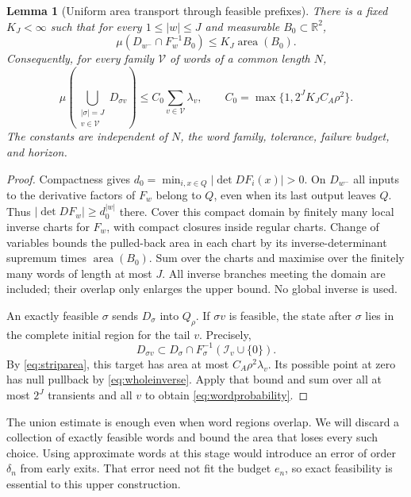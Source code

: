 \documentclass[11pt]{amsart}
\newtheorem{lemma}[theorem]{Lemma}
\theoremstyle{definition}
\theoremstyle{remark}
\newcommand{\R}{\mathbb R}
\newcommand{\area}{\operatorname{area}}
\numberwithin{equation}{section}
\begin{document}
\begin{lemma}[Uniform area transport through feasible prefixes]\label{lem:probtransport}
There is a fixed $K_J<\infty$ such that for every $1\le|w|\le J$
and measurable $B_0\subset\R^2$,
\begin{equation}\label{eq:wholeinverse}
\mu(D_{w^-}\cap F_w^{-1}B_0)\le K_J\area(B_0).
\end{equation}
Consequently, for every family $\mathcal V$ of words of a common
length $N$,
\begin{equation}\label{eq:wordprobability}
\mu\!\left(\bigcup_{\substack{|\sigma|=J\\v\in\mathcal V}}
D_{\sigma v}\right)\le C_0\sum_{v\in\mathcal V}\lambda_v,
\qquad C_0=\max\{1,2^JK_JC_A\rho^2\}.
\end{equation}
The constants are independent of $N$, the word family, tolerance,
failure budget, and horizon.
\end{lemma}
\begin{proof}
Compactness gives $d_0=\min_{i,x\in Q}|\det DF_i(x)|>0$.
On $D_{w^-}$ all inputs to the derivative factors of $F_w$
belong to $Q$, even when its last output leaves $Q$. Thus
$|\det DF_w|\ge d_0^{|w|}$ there. Cover this compact domain by
finitely many local inverse charts for $F_w$, with compact closures
inside regular charts. Change of variables bounds the pulled-back
area in each chart by its inverse-determinant supremum times
$\area(B_0)$. Sum over the charts and maximise over the finitely
many words of length at most $J$. All inverse branches meeting the
domain are included; their overlap only enlarges the upper bound.
No global inverse is used.

An exactly feasible $\sigma$ sends $D_\sigma$ into $Q_\rho$.
If $\sigma v$ is feasible, the state after $\sigma$ lies in the
complete initial region for the tail $v$. Precisely,
\[
D_{\sigma v}\subset
D_\sigma\cap F_\sigma^{-1}(\mathcal I_v\cup\{0\}).
\]
By \eqref{eq:striparea}, this target has area at most
$C_A\rho^2\lambda_v$. Its possible point at zero has null
pullback by \eqref{eq:wholeinverse}. Apply that bound and sum
over all at most $2^J$ transients and all $v$ to obtain
\eqref{eq:wordprobability}.
\end{proof}

The union estimate is enough even when word regions overlap.
We will discard a collection of exactly feasible words and bound
the area that loses every such choice. Using approximate words
at this stage would introduce an error of order $\delta_n$ from
early exits. That error need not fit the budget $e_n$, so exact
feasibility is essential to this upper construction.
\end{document}
